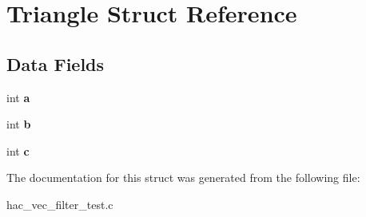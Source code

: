 \hypertarget{structTriangle}{}\section{Triangle Struct Reference}
\label{structTriangle}
\subsection*{Data Fields}
\begin{DoxyCompactItemize}
\item 
\hypertarget{structTriangle_aa1781b2e0265b3fef1d7aa02430a7821}{}int {\bfseries a}\label{structTriangle_aa1781b2e0265b3fef1d7aa02430a7821}

\item 
\hypertarget{structTriangle_a21716fc2fbee90ddb3c2b1bc25e81590}{}int {\bfseries b}\label{structTriangle_a21716fc2fbee90ddb3c2b1bc25e81590}

\item 
\hypertarget{structTriangle_a9dd1e0dd08b2f7bbbb453063bacc7cf9}{}int {\bfseries c}\label{structTriangle_a9dd1e0dd08b2f7bbbb453063bacc7cf9}

\end{DoxyCompactItemize}


The documentation for this struct was generated from the following file\+:\begin{DoxyCompactItemize}
\item 
hac\+\_\+vec\+\_\+filter\+\_\+test.\+c\end{DoxyCompactItemize}

